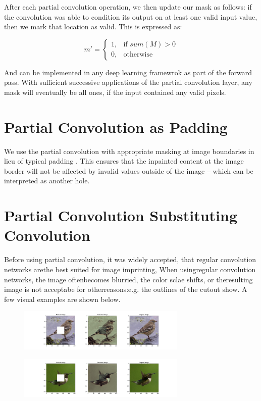 \documentclass[conference]{IEEEtran}
\begin{document}
After each partial convolution operation, we then update our mask as follows:
if the convolution was able to condition its output on at least one valid input value, then we mark that location as valid. This is expressed as:

\begin{equation}
{m}' = \begin{cases}
1, & \text{if } sum(M) > 0 \\
0, & \text{otherwise}
\end{cases}
\end{equation}

And can be implemented in any deep learning framewrok as part of the forward pass. With sufficient successive applications of the partial convolution layer, any mask will eventually be all ones, if the input contained any valid pixels.

\section{Partial Convolution as Padding}
We use the partial convolution with
appropriate masking at image boundaries in lieu of typical padding . This ensures
that the inpainted content at the image border will not be affected by invalid
values outside of the image – which can be interpreted as another hole.

\section{Partial Convolution Substituting Convolution}
Before using partial convolution, it was widely accepted, that regular convolution networks arethe best suited for image imprinting, When usingregular convolution networks, the image oftenbecomes blurried, the color sclae shifts, or theresulting image is not acceptabe for otherreasons:e.g. the outlines of the cutout show. A few visual examples are shown below.

\begin{figure}[!htb]
  \centering
  \includegraphics[width=80mm, keepaspectratio]{figures/err_1.png}
\end{figure}

\begin{figure}[!htb]
  \centering
  \includegraphics[width=80mm, keepaspectratio]{figures/err_2.png}
\end{figure}
\end{document}
